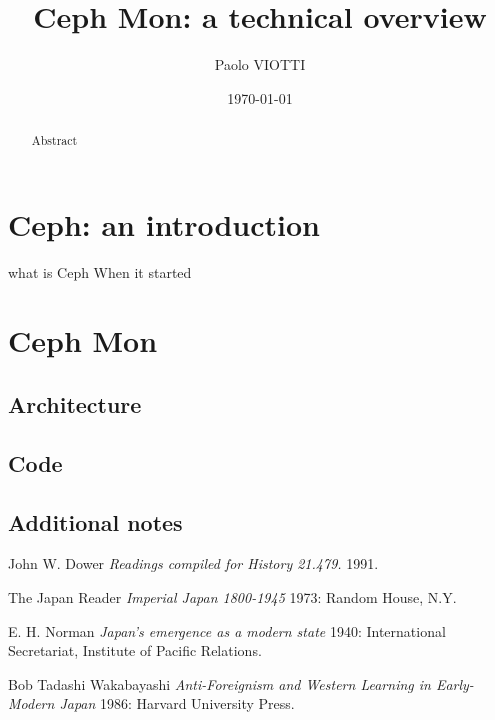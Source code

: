 \documentclass{article}
\title{Ceph Mon: a technical overview}
\author{Paolo VIOTTI}
\date{\today}
\begin{document}
\maketitle

\begin{abstract}
Abstract
\end{abstract}

\section{Ceph: an introduction}
what is Ceph
When it started

\section{Ceph Mon}

\subsection{Architecture}


\subsection{Code}


\subsection{Additional notes}


\begin{thebibliography}{1}

   John W. Dower {\em Readings compiled for History
  21.479.}  1991.

    The Japan Reader {\em Imperial Japan 1800-1945} 1973:
  Random House, N.Y.

   E. H. Norman {\em Japan's emergence as a modern
  state} 1940: International Secretariat, Institute of Pacific
  Relations.

   Bob Tadashi Wakabayashi {\em Anti-Foreignism and Western
  Learning in Early-Modern Japan} 1986: Harvard University Press.

\end{thebibliography}
	
\end{document}
